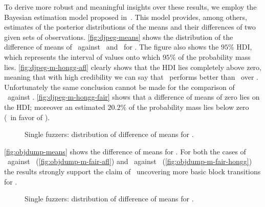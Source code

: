 To derive more robust and meaningful insights over these results, we employ the
Bayesian estimation model proposed in~\cite{kruschke2013bayesian}. This model
provides, among others, estimates of the posterior distributions of the means
and their differences of two given sets of observations.
\autoref{fig:djpeg-means} shows the distribution of the difference of means of
\honggfuzz\ against \aflfast\ and \fairfuzz\ for \djpeg. The figure also shows
the $95\%$ \ac{HDI}, which represents the interval of values onto which $95\%$
of the probability mass lies. \autoref{fig:djpeg-m-hongg-afl} clearly shows that
the \ac{HDI} lies completely above zero, meaning that with high credibility we
can say that \honggfuzz\ performs better than \aflfast\ over \djpeg.
Unfortunately the same conclusion cannot be made for the comparison of
\honggfuzz\ against \fairfuzz. \autoref{fig:djpeg-m-hongg-fair} shows that a
difference of means of zero lies on the \ac{HDI}; moreover an estimated $20.2\%$
of the probability mass lies below zero (\ie~in favor of \fairfuzz).

\begin{figure}[h]
    \centering%
    \caption{Single fuzzers: distribution of difference of means for \djpeg.}
    \label{fig:djpeg-means}
\end{figure}

\autoref{fig:objdump-means} shows the difference of means for \objdump. For both
the cases of \fairfuzz\ against \aflfast\ (\autoref{fig:objdump-m-fair-afl}) and
\fairfuzz\ against \honggfuzz\ (\autoref{fig:objdump-m-fair-hongg}) the results
strongly support the claim of \fairfuzz\ uncovering more basic block transitions
for \objdump.

\begin{figure}[h]
    \centering%
    \caption{Single fuzzers: distribution of difference of means for \objdump.}
    \label{fig:objdump-means}
\end{figure}

